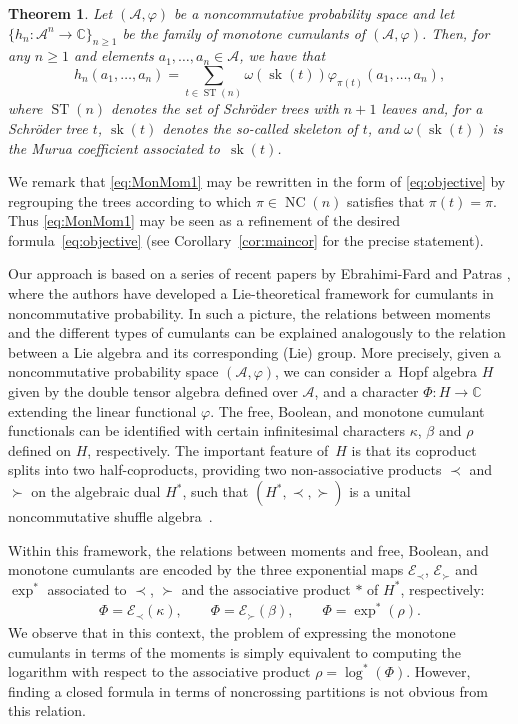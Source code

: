 \documentclass[11pt]{article}
\numberwithin{equation}{section}
\numberwithin{equation}{section}
\newtheorem{Theorem}{Theorem}[section]
\newcommand{\A}{\mathcal{A}}
\newcommand{\NC}{\operatorname{NC}}
\newcommand{\ST}{\operatorname{ST}}
\newcommand{\sk}{\operatorname{sk}}
\begin{document}
\begin{Theorem}\label{thm:mainthm1}
Let $(\A,\varphi)$ be a noncommutative probability space and let $\{h_n\colon \A^n\to\mathbb{C}\}_{n\geq1}$ be the family of monotone cumulants of $(\A,\varphi)$. Then, for any $n\geq1$ and elements $a_1,\dots,a_n\in \A$, we have that
\begin{equation}\label{eq:MonMom1}
	h_n(a_1,\dots,a_n) =\sum_{t\in \ST(n)} \omega(\sk(t))\varphi_{\pi(t)} (a_1,\dots,a_n),
\end{equation}
where $\ST(n)$ denotes the set of Schr\"oder trees with $n+1$ leaves and, for a Schr\"oder tree $t$, $\sk(t)$ denotes the so-called skeleton of $t$, and $\omega(\sk(t))$ is the Murua coefficient associated to~$\sk(t)$.
\end{Theorem}

We remark that \eqref{eq:MonMom1} may be rewritten in the form of \eqref{eq:objective} by regrouping the trees according to which $\pi\in \NC(n)$ satisfies that $\pi(t)=\pi$. Thus \eqref{eq:MonMom1} may be seen as a refinement of the desired formula~\eqref{eq:objective} (see Corollary~\ref{cor:maincor} for the precise statement).

Our approach is based on a series of recent papers by Ebrahimi-Fard and Patras \cite{EFP1,EFP2,EFP3,EFP4,EFP5}, where the authors have developed a Lie-theoretical framework for cumulants in noncommutative probability. In such a picture, the relations between moments and the different types of cumulants can be explained analogously to the relation between a Lie algebra and its corresponding (Lie) group. More precisely, given a noncommutative probability space $(\A,\varphi)$, we can consider a~Hopf algebra $H$ given by the double tensor algebra defined over $\A$, and a character $\Phi\colon H \to \mathbb{C}$ extending the linear functional $\varphi$. The free, Boolean, and monotone cumulant functionals can be identified with certain infinitesimal characters $\kappa$, $\beta$ and $\rho$ defined on $H$, respectively. The important feature of~$H$ is that its coproduct splits into two half-coproducts, providing two non-associative products $\prec$ and $\succ$ on the algebraic dual $H^*$, such that $(H^*,\prec,\succ)$ is a unital noncommutative shuffle algebra~\cite{EFP1}.

Within this framework, the relations between moments and free, Boolean, and monotone cumulants are encoded by the three exponential maps $\mathcal{E}_\prec$, $\mathcal{E}_\succ$ and $\exp^*$ associated to $\prec$, $\succ$ and the associative product $*$ of $H^*$, respectively:
\begin{gather*}
\Phi = \mathcal{E}_\prec(\kappa),
\qquad \Phi = \mathcal{E}_{\succ}(\beta),
\qquad \Phi = \exp^*(\rho).
\end{gather*}
We observe that in this context, the problem of expressing the monotone cumulants in terms of the moments is simply equivalent to computing the logarithm with respect to the associative product $\rho = \log^*(\Phi).$ However, finding a closed formula in terms of noncrossing partitions is not obvious from this relation.
\end{document}

